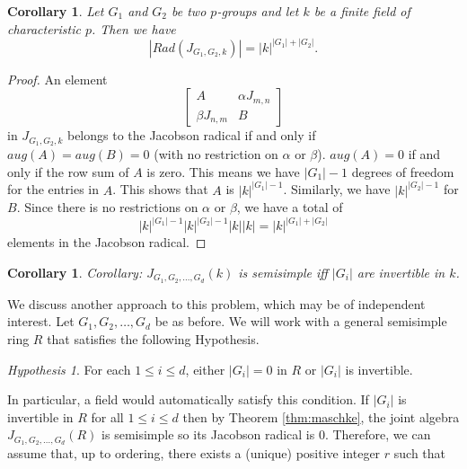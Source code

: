\documentclass[12pt, a4paper]{amsart}
\numberwithin{equation}{section} %
\theoremstyle{plain}
\theoremstyle{definition}
\theoremstyle{plain}
\newtheorem{cor}[thm]{Corollary}
\theoremstyle{remark}
\newtheorem{Hypothesis}[thm]{Hypothesis}
\begin{document}
\begin{cor}
Let $G_1$ and $G_2$ be two $p$-groups and let $k$ be a finite field of characteristic $p$. Then we have 
\[ | Rad(J_{G_1, G_2, k}) | = |k|^{|G_1| +|G_2|}. \]
\end{cor}

\begin{proof}
An element 
\[\begin{bmatrix}
A & \alpha J_{m, n} \\
\beta J_{n, m} & B
\end{bmatrix}\]
in $J_{G_1, G_2, k}$ belongs to the Jacobson radical if and only if $aug(A) = aug(B)= 0$ (with no restriction on  $\alpha$ or $\beta$). $aug(A) = 0$ if and only if the row sum of $A$ is zero.  This means we have $|G_1|-1$ degrees of freedom for the entries in $A$.  This shows that $A$ is $|k|^{|G_1|-1}$.  Similarly, we have $|k|^{|G_2|-1}$ for $B$. Since there is no  restrictions on $\alpha$ or $\beta$, we have a total of 
\[|k|^{|G_1|-1} |k|^{|G_2|-1} |k| |k| = |k|^{|G_1| +|G_2|}\]
elements in the Jacobson radical.
\end{proof}

{\color{red} 
\begin{cor}Corollary: $J_{G_1, G_2, \ldots, G_d}(k)$ is semisimple iff $|G_i|$ are invertible in $k$. 
\end{cor}}
We discuss another approach to this problem, which may be of independent interest. Let $G_1, G_2, \ldots, G_d$ be as before. We will work with a general semisimple ring $R$ that satisfies the following Hypothesis. 
\begin{Hypothesis} For each $1 \leq i \leq d$, either $|G_i|=0$ in $R$ or $|G_i|$ is invertible. 
\end{Hypothesis}
In particular, a field would automatically satisfy this condition.  If $|G_i|$ is invertible in $R$ for all $1 \leq i \leq d$ then by Theorem \ref{thm:maschke}, the joint algebra $J_{G_1, G_2, \ldots, G_d}(R)$ is semisimple so its Jacobson radical is $0$. Therefore, we can assume that, up to ordering, there exists a (unique) positive integer $r$ such that 
\end{document}
